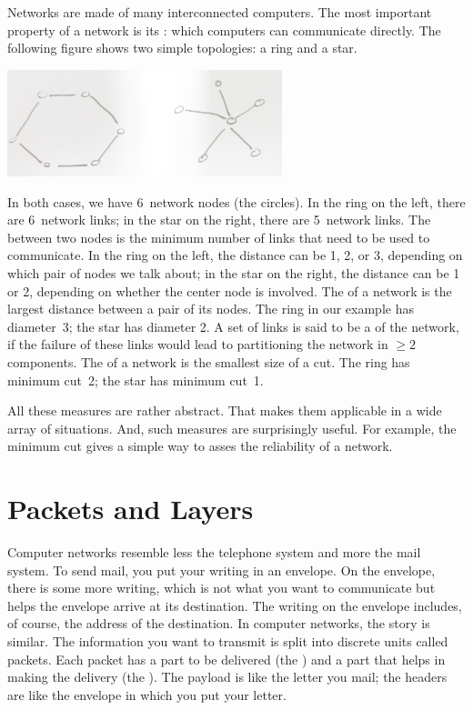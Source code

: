 Networks are made of many interconnected computers.
The most important property of a network is its :
  which computers can communicate directly.
The following figure shows two simple topologies: a ring and a star.
\begin{center}
\includegraphics[width=0.6\textwidth]{ring-star.jpg}
\end{center}
In both cases, we have 6~network nodes (the circles).
In the ring on the left, there are 6~network links;
in the star on the right, there are 5~network links.
The  between two nodes is the minimum number of links
  that need to be used to communicate.
In the ring on the left,
  the distance can be 1, 2, or 3, depending on which pair of nodes we talk about;
in the star on the right,
  the distance can be 1 or 2, depending on whether the center node is involved.
The  of a network is the largest distance between a pair of its nodes.
The ring in our example has diameter~3;
the star has diameter 2.
A set of links is said to be a  of the network,
  if the failure of these links would lead to partitioning the network
    in $\ge2$ components.
The  of a network is the smallest size of a cut.
The ring has minimum cut~2;
  the star has minimum cut~1.

All these measures are rather abstract.
That makes them applicable in a wide array of situations.
And, such measures are surprisingly useful.
For example,
  the minimum cut gives a simple way to asses the reliability of a network.

\section{Packets and Layers}

Computer networks resemble less the telephone system and more the mail system.
To send mail, you put your writing in an envelope.
On the envelope, there is some more writing,
  which is not what you want to communicate
  but helps the envelope arrive at its destination.
The writing on the envelope includes, of course,
  the address of the destination.
In computer networks, the story is similar.
The information you want to transmit is split into discrete units called packets.
Each packet has a part to be delivered (the )
  and a part that helps in making the delivery (the ).
The payload is like the letter you mail;
  the headers are like the envelope in which you put your letter.

